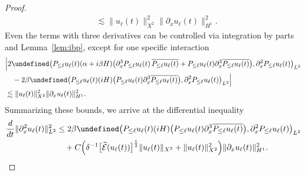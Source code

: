 \documentclass{amsart}
\numberwithin{equation}{section}
\let\Re=\undefined\DeclareMathOperator{\Re}{Re}
\begin{document}
\begin{proof}
$$\begin{aligned}
&\lesssim \| u_\ell(t) \|_{X^2}^2\| \partial_xu_\ell(t) \|_{H^1}^2.
\end{aligned} $$Even the terms with three derivatives can be controlled via integration by parts and Lemma~\ref{lem:ibp}, except for one specific interaction
$$\begin{aligned}
&\Big| 2\Re \big( P_{\leq \ell}u_\ell(t)(\alpha +i\beta H)\big(\partial_x^3P_{\leq \ell}u_\ell(t)\,\overline{P_{\leq \ell}u_\ell(t)}+P_{\leq \ell}u_\ell(t)\partial_x^3\overline{P_{\leq \ell}u_\ell(t)}\big) ,\partial_x^2P_{\leq \ell}u_\ell(t)\big)_{L^2} \\
&\quad -2\beta\Re \big( P_{\leq \ell}u_\ell(t)(iH)\big( P_{\leq \ell}u_\ell(t)\partial_x^3\overline{P_{\leq \ell}u_\ell(t)}\big) ,\partial_x^2P_{\leq \ell}u_\ell(t)\big)_{L^2} \Big| \\
&\lesssim \| u_\ell(t) \|_{X^2}^2\| \partial_xu_\ell(t) \|_{H^1}^2.
\end{aligned} $$
Summarizing these bounds, we arrive at the differential inequality
\begin{equation}\label{est:aprioriZ2-1}
\begin{aligned}
\frac{d}{dt}\| \partial_x^2u_\ell(t) \|_{L^2}^2 &\leq 2\beta\Re \big( P_{\leq \ell}u_\ell(t)(iH)\big( P_{\leq \ell}u_\ell(t)\partial_x^3\overline{P_{\leq \ell}u_\ell(t)}\big) ,\partial_x^2P_{\leq \ell}u_\ell(t)\big)_{L^2} \\
&\quad +C\Big( \delta^{-1}\big[ \widetilde{\mathcal{E}}(u_\ell(t))\big] ^{\frac12}\| u_\ell(t) \|_{X^2}+\| u_\ell(t) \|_{X^2}^2\Big) \| \partial_xu_\ell(t) \|_{H^1}^2.\end{aligned}\end{equation}


\end{proof}
\end{document}
